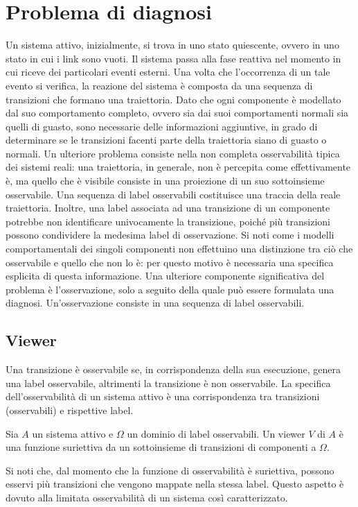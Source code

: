 \section{Problema di diagnosi}
Un sistema attivo, inizialmente, si trova in uno stato quiescente, ovvero in uno stato in cui i link sono vuoti. Il sistema passa alla fase reattiva nel momento in cui riceve dei particolari eventi esterni. Una volta che l'occorrenza di un tale evento si verifica, la reazione del sistema è composta da una sequenza di transizioni che formano una traiettoria. Dato che ogni componente è modellato dal suo comportamento completo, ovvero sia dai suoi comportamenti normali sia quelli di guasto, sono necessarie delle informazioni aggiuntive, in grado di determinare se le transizioni facenti parte della traiettoria siano di guasto o normali. Un ulteriore problema consiste nella non completa osservabilità tipica dei sistemi reali: una traiettoria, in generale, non è percepita come effettivamente è, ma quello che è visibile consiste in una proiezione di un suo sottoinsieme osservabile. Una sequenza di label osservabili costituisce una traccia della reale traiettoria. Inoltre, una label associata ad una transizione di un componente potrebbe non identificare univocamente la transizione, poiché più transizioni possono condividere la medesima label di osservazione. Si noti come i modelli comportamentali dei singoli componenti non effettuino una distinzione tra ciò che osservabile e quello che non lo è: per questo motivo è necessaria una specifica esplicita di questa informazione. Una ulteriore componente significativa del problema è l'osservazione, solo a seguito della quale può essere formulata una diagnosi. Un'osservazione consiste in una sequenza di label osservabili.

\subsection{Viewer}
Una transizione è osservabile se, in corrispondenza della sua esecuzione, genera una label osservabile, altrimenti la transizione è non osservabile. La specifica dell'osservabilità di un sistema attivo è una corrispondenza tra transizioni (osservabili) e rispettive label.
\begin{defn}
Sia $A$ un sistema attivo e $\Omega$ un dominio di label osservabili. Un viewer $V$ di $A$ è una funzione suriettiva da un sottoinsieme di transizioni di componenti a $\Omega$.
\end{defn}
Si noti che, dal momento che la funzione di osservabilità è suriettiva, possono esservi più transizioni che vengono mappate nella stessa label. Questo aspetto è dovuto alla limitata osservabilità di un sistema così caratterizzato.

